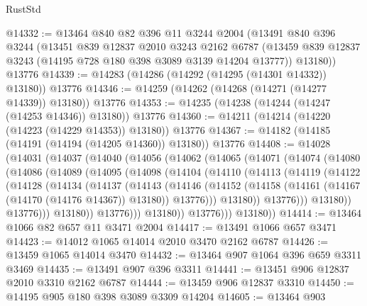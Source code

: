 \begin{lexlean}{RustStd}
\begin{coremodule}
@14332 := @13464
    @840
    @82
    @396
    @11
    @3244
    @2004
    (@13491
      @840
      @396
      @3244
      (@13451
        @839
        @12837
        @2010
        @3243
        @2162
        @6787
        (@13459 @839 @12837 @3243 (@14195 @728 @180 @398 @3089 @3139 @14204 @13777))
        @13180))
    @13776
@14339 := @14283 (@14286 (@14292 (@14295 (@14301 @14332)) @13180)) @13776
@14346 := @14259 (@14262 (@14268 (@14271 (@14277 @14339)) @13180)) @13776
@14353 := @14235 (@14238 (@14244 (@14247 (@14253 @14346)) @13180)) @13776
@14360 := @14211 (@14214 (@14220 (@14223 (@14229 @14353)) @13180)) @13776
@14367 := @14182 (@14185 (@14191 (@14194 (@14205 @14360)) @13180)) @13776
@14408 := @14028
    (@14031
      (@14037
        (@14040
          (@14056
            (@14062
              (@14065
                (@14071
                  (@14074
                    (@14080
                      (@14086
                        (@14089
                          (@14095
                            (@14098
                              (@14104
                                (@14110
                                  (@14113
                                    (@14119
                                      (@14122
                                        (@14128
                                          (@14134
                                            (@14137
                                              (@14143
                                                (@14146
                                                  (@14152
                                                    (@14158
                                                      (@14161
                                                        (@14167 (@14170 (@14176 @14367)) @13180))
                                                      @13776)))
                                                @13180))
                                            @13776)))
                                      @13180))
                                  @13776)))
                            @13180))
                        @13776)))
                  @13180))
              @13776)))
        @13180))
@14414 := @13464 @1066 @82 @657 @11 @3471 @2004
@14417 := @13491 @1066 @657 @3471
@14423 := @14012 @1065 @14014 @2010 @3470 @2162 @6787
@14426 := @13459 @1065 @14014 @3470
@14432 := @13464 @907 @1064 @396 @659 @3311 @3469
@14435 := @13491 @907 @396 @3311
@14441 := @13451 @906 @12837 @2010 @3310 @2162 @6787
@14444 := @13459 @906 @12837 @3310
@14450 := @14195 @905 @180 @398 @3089 @3309 @14204
@14605 := @13464
    @903

\end{coremodule}
\end{lexlean}
